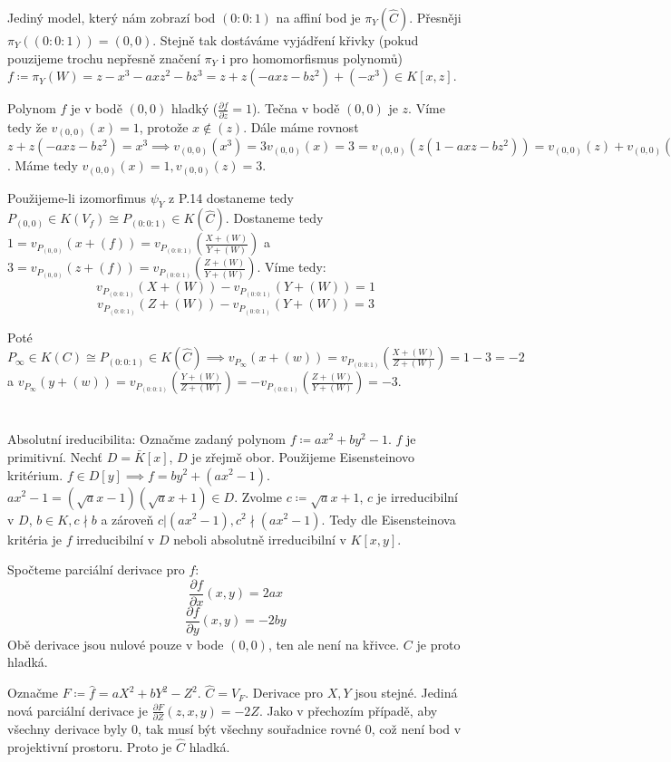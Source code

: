 \documentclass[12pt, a4paper]{article}
\begin{document}
Jediný model, který nám zobrazí bod $(0:0:1)$ na affiní bod je $\pi_Y(\hat{C})$. Přesněji $\pi_Y((0:0:1))=(0,0)$. Stejně tak dostáváme vyjádření křivky (pokud pouzijeme trochu nepřesně značení $\pi_Y$ i pro homomorfismus polynomů) $f \coloneqq \pi_Y(W) = z - x^3 - axz^2 - bz^3 = z + z(-axz - bz^2) + (-x^3) \in K[x,z]$.

Polynom $f$ je v bodě $(0,0)$ hladký ($\frac{\partial f}{\partial z} = 1$). Tečna v bodě $(0,0)$ je $z$. Víme tedy že $v_{(0,0)}(x) = 1$, protože $x \notin (z)$. Dále máme rovnost $z + z(-axz - bz^2) = x^3 \implies v_{(0,0)}(x^3) = 3v_{(0,0)}(x) = 3 = v_{(0,0)}(z(1 -axz - bz^2)) = v_{(0,0)}(z) + v_{(0,0)}(1 -axz - bz^2) = v_{(0,0)}(z)$. Máme tedy $v_{(0,0)}(x)=1, v_{(0,0)}(z) = 3$.

Použijeme-li izomorfimus $\psi_Y$ z P.14 dostaneme tedy $P_{(0,0)} \in K(V_f) \cong P_{(0:0:1)} \in K(\hat{C})$. Dostaneme tedy $1 = v_{P_{(0,0)}}(x+(f)) = v_{P_{(0:0:1)}}(\frac{X+(W)}{Y+(W)})$ a $3 = v_{P_{(0,0)}}(z+(f)) = v_{P_{(0:0:1)}}(\frac{Z+(W)}{Y+(W)})$. Víme tedy:
\[
v_{P_{(0:0:1)}}(X+(W)) - v_{P_{(0:0:1)}}({Y+(W)}) = 1
\]
\[
v_{P_{(0:0:1)}}(Z+(W)) - v_{P_{(0:0:1)}}({Y+(W)}) = 3
\]

Poté $P_{\infty} \in K(C) \cong P_{(0:0:1)} \in K(\hat{C}) \implies v_{P_\infty}(x+(w)) = v_{P_{(0:0:1)}}(\frac{X+(W)}{Z+(W)}) = 1 - 3 = -2$ a $v_{P_\infty}(y+(w)) = v_{P_{(0:0:1)}}(\frac{Y+(W)}{Z+(W)}) = -v_{P_{(0:0:1)}}(\frac{Z+(W)}{Y+(W)}) = -3$.
\section{}
Absolutní ireducibilita: Označme zadaný polynom $f \coloneqq ax^2+by^2-1$. $f$ je primitivní. Nechť $D = \bar{K}[x]$, $D$ je zřejmě obor. Použijeme Eisensteinovo kritérium. $f \in D[y] \implies f = by^2 + (ax^2-1)$. $ax^2-1 = (\sqrt{a}x-1)(\sqrt{a}x+1) \in D$. Zvolme $c \coloneqq \sqrt{a}x+1$, $c$ je irreducibilní v $D$,  $b \in K, c \nmid b$ a zároveň $c | (ax^2-1), c^2 \nmid (ax^2-1)$. Tedy dle Eisensteinova kritéria je $f$ irreducibilní v $D$ neboli absolutně irreducibilní v $K[x,y]$.

Spočteme parciální derivace pro $f$:
\[
\frac{\partial f}{\partial x}(x,y) = 2ax
\]
\[
\frac{\partial f}{\partial y}(x,y) = -2by
\]
Obě derivace jsou nulové pouze v bode $(0,0)$, ten ale není na křivce. $C$ je proto hladká.

Označme $F \coloneqq \hat{f} = aX^2+bY^2-Z^2$. $\hat{C} = V_F$.  Derivace pro $X,Y$ jsou stejné. Jediná nová parciální derivace je $\frac{\partial F}{\partial Z}(z,x,y) = -2Z$. Jako v přechozím případě, aby všechny derivace byly 0, tak musí být všechny souřadnice rovné 0, což není bod v projektivní prostoru. Proto je $\hat{C}$ hladká.
\end{document}
